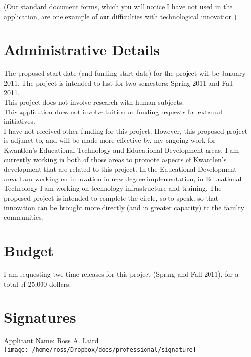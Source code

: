 \documentclass[10pt, letterpaper]{article}
\begin{document}
({\footnotesize \dag Our standard document forms, which you will notice I have not used in the application, are one example of our difficulties with technological innovation.})

\section*{Administrative Details}

The proposed start date (and funding start date) for the project will be January 2011. The project is intended to last for two semesters: Spring 2011 and Fall 2011.\\

This project does not involve research with human subjects.\\

This application does not involve tuition or funding requests for external initiatives.\\

I have not received other funding for this project. However, this proposed project is adjunct to, and will be made more effective by, my ongoing work for Kwantlen's Educational Technology and Educational Development areas. I am currently working in both of those areas to promote aspects of Kwantlen's development that are related to this project. In the Educational Development area I am working on innovation in new degree implementation; in Educational Technology I am working on technology infrastructure and training. The proposed project is intended to complete the circle, so to speak, so that innovation can be brought more directly (and in greater capacity) to the faculty communities.

\section*{Budget}

I am requesting two time releases for this project (Spring and Fall 2011), for a total of 25,000 dollars.

\section*{Signatures}

Applicant Name: Ross A. Laird\\

\texttt{[image: /home/ross/Dropbox/docs/professional/signature]}\\[1em]
\end{document}
